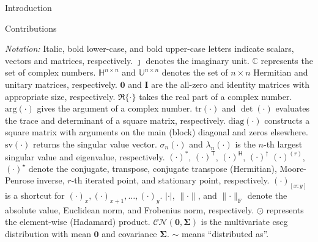 \documentclass[journal]{IEEEtran}
\begin{document}
\begin{section}{Introduction}
\begin{subsection}{Contributions}
	\end{subsection}

	\emph{Notation:}
	Italic, bold lower-case, and bold upper-case letters indicate scalars, vectors and matrices, respectively.
	$\jmath$ denotes the imaginary unit.
	$\mathbb{C}$ represents the set of complex numbers.
	$\mathbb{H}^{n \times n}$ and $\mathbb{U}^{n \times n}$ denotes the set of $n \times n$ Hermitian and unitary matrices, respectively.
	$\mathbf{0}$ and $\mathbf{I}$ are the all-zero and identity matrices with appropriate size, respectively.
	$\Re\{\cdot\}$ takes the real part of a complex number.
	$\mathrm{arg}(\cdot)$ gives the argument of a complex number.
	$\mathrm{tr}(\cdot)$ and $\det(\cdot)$ evaluates the trace and determinant of a square matrix, respectively.
	$\mathrm{diag}(\cdot)$ constructs a square matrix with arguments on the main (block) diagonal and zeros elsewhere.
	$\mathrm{sv}(\cdot)$ returns the singular value vector.
	$\sigma_n(\cdot)$ and $\lambda_n(\cdot)$ is the $n$-th largest singular value and eigenvalue, respectively.
	$(\cdot)^*$, $(\cdot)^\mathsf{T}$, $(\cdot)^\mathsf{H}$, $(\cdot)^\dagger$ $(\cdot)^{(r)}$, $(\cdot)^{\star}$ denote the conjugate, transpose, conjugate transpose (Hermitian), Moore-Penrose inverse, $r$-th iterated point, and stationary point, respectively.
	$(\cdot)_{[x:y]}$ is a shortcut for $(\cdot)_x,(\cdot)_{x+1},\ldots,(\cdot)_y$.
	$\lvert \cdot \rvert$, $\lVert \cdot \rVert$, and $\lVert \cdot \rVert _\mathrm{F}$ denote the absolute value, Euclidean norm, and Frobenius norm, respectively.
	$\odot$ represents the element-wise (Hadamard) product.
	$\mathcal{CN}(\mathbf{0}, \mathbf{\Sigma})$ is the multivariate \gls{cscg} distribution with mean $\mathbf{0}$ and covariance $\mathbf{\Sigma}$.
	$\sim$ means ``distributed as''.
\end{section}
\end{document}
